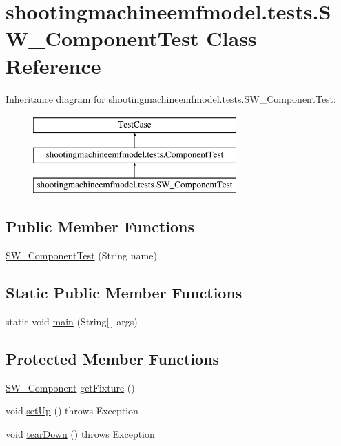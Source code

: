 \hypertarget{classshootingmachineemfmodel_1_1tests_1_1_s_w___component_test}{\section{shootingmachineemfmodel.\-tests.\-S\-W\-\_\-\-Component\-Test Class Reference}
\label{classshootingmachineemfmodel_1_1tests_1_1_s_w___component_test}
}
Inheritance diagram for shootingmachineemfmodel.\-tests.\-S\-W\-\_\-\-Component\-Test\-:\begin{figure}[H]
\begin{center}
\leavevmode
\includegraphics[height=3.000000cm]{classshootingmachineemfmodel_1_1tests_1_1_s_w___component_test}
\end{center}
\end{figure}
\subsection*{Public Member Functions}
\begin{DoxyCompactItemize}
\item 
\hyperlink{classshootingmachineemfmodel_1_1tests_1_1_s_w___component_test_a8774584638f30080583f2df8c8b52206}{S\-W\-\_\-\-Component\-Test} (String name)
\end{DoxyCompactItemize}
\subsection*{Static Public Member Functions}
\begin{DoxyCompactItemize}
\item 
static void \hyperlink{classshootingmachineemfmodel_1_1tests_1_1_s_w___component_test_a375a29ecb19dedcb5670f115b8fd02e6}{main} (String\mbox{[}$\,$\mbox{]} args)
\end{DoxyCompactItemize}
\subsection*{Protected Member Functions}
\begin{DoxyCompactItemize}
\item 
\hyperlink{interfaceshootingmachineemfmodel_1_1_s_w___component}{S\-W\-\_\-\-Component} \hyperlink{classshootingmachineemfmodel_1_1tests_1_1_s_w___component_test_a8fc336756913324de5fc121d1b57b996}{get\-Fixture} ()
\item 
void \hyperlink{classshootingmachineemfmodel_1_1tests_1_1_s_w___component_test_a4168eadf97a9fcffb31179847e2bfa3b}{set\-Up} ()  throws Exception 
\item 
void \hyperlink{classshootingmachineemfmodel_1_1tests_1_1_s_w___component_test_ab458907582407d2e775e41e8eea9e179}{tear\-Down} ()  throws Exception 
\end{DoxyCompactItemize}
